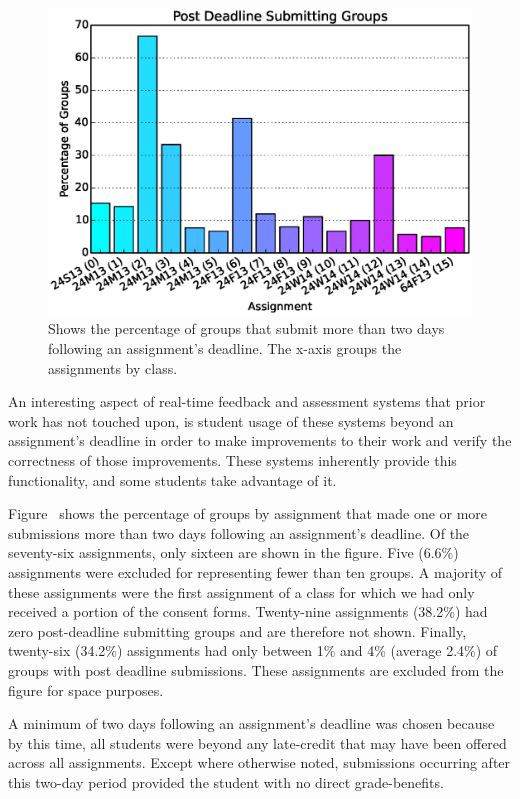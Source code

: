 \begin{figure}[!t]
\centering
\includegraphics[width=5.25in]{graphs/Post_Deadline_Submitting_Groups.eps}
\caption{Shows the percentage of groups that submit more than two days
  following an assignment's deadline. The x-axis groups the assignments by
  class.}
\end{figure}

An interesting aspect of real-time feedback and assessment systems that prior
work has not touched upon, is student usage of these systems beyond an
assignment's deadline in order to make improvements to their work and verify
the correctness of those improvements. These systems inherently provide this
functionality, and some students take advantage of it.

Figure~ shows the percentage of groups by assignment that
made one or more submissions more than two days following an assignment's
deadline. Of the seventy-six assignments, only sixteen are shown in the
figure. Five (6.6\%) assignments were excluded for representing fewer than ten
groups. A majority of these assignments were the first assignment of a class
for which we had only received a portion of the consent forms. Twenty-nine
assignments (38.2\%) had zero post-deadline submitting groups and are therefore
not shown. Finally, twenty-six (34.2\%) assignments had only between 1\% and
4\% (average 2.4\%) of groups with post deadline submissions. These assignments
are excluded from the figure for space purposes.

A minimum of two days following an assignment's deadline was chosen because by
this time, all students were beyond any late-credit that may have been offered
across all assignments. Except where otherwise noted, submissions occurring
after this two-day period provided the student with no direct grade-benefits.

